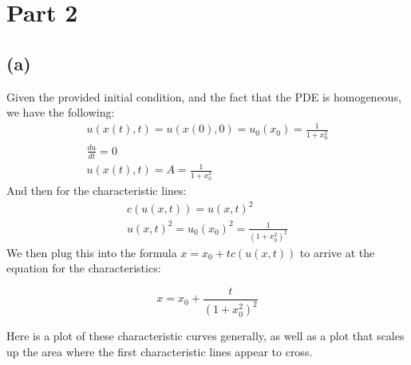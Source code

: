 \documentclass{article}
\begin{document}
\section*{Part 2}
\subsection*{(a)}
Given the provided initial condition, and the fact that the PDE is homogeneous, we have the following:
\begin{equation}
\begin{aligned}
u(x(t), t) = u(x(0), 0) = u_0(x_0) = \frac{1}{1+x_0^2}\\
\frac{du}{dt} = 0\\
u(x(t), t) = A = \frac{1}{1+x_0^2}
\end{aligned}
\end{equation}
And then for the characteristic lines:
\begin{equation}
\begin{aligned}
c(u(x,t)) = u(x,t)^2\\
u(x,t)^2 = u_0(x_0)^2 = \frac{1}{(1+x_0^2)^2}
\end{aligned}
\end{equation}
We then plug this into the formula $x = x_0 + tc(u(x,t))$ to arrive at the equation for the characteristics:
\begin{tcolorbox}[minipage,colback=white,arc=0pt,outer arc=0pt]
\begin{equation}
x = x_0 + \frac{t}{(1+x_0^2)^2}
\end{equation}
\end{tcolorbox}
Here is a plot of these characteristic curves generally, as well as a plot that scales up the area where the first characteristic lines appear to cross.
\end{document}

